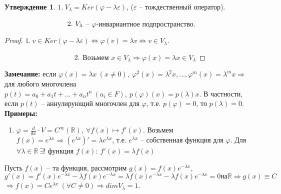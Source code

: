 \documentclass[a4paper, 12pt]{article}
\newcommand\tab[1][.5cm]{\hspace*{#1}}
\theoremstyle{definition}
\newtheorem*{subtheorem}{Утверждение}
\begin{document}
    \begin{subtheorem}
        $1.\ V_\lambda = Ker(\varphi - \lambda \varepsilon)$,
        ($\varepsilon$ -- тождественный оператор).
        
        $\tab[3.15cm] 2.\ V_\lambda$ -- $\varphi$-инвариантное
        подпространство. 
    \end{subtheorem}
    \begin{proof}
        $1.\ v \in Ker(\varphi - \lambda \varepsilon)
        \Longleftrightarrow \varphi(v) = \lambda v
        \Longleftrightarrow v \in V_\lambda$.

        $\tab[3.5cm]2.$ Возьмем $x \in V_\lambda \Longrightarrow 
        \varphi(x) = \lambda x \in V_\lambda$   
    \end{proof}
    \textbf{Замечание:} если $\varphi(x) = \lambda x\ (x \neq 0),\ 
    \varphi^2(x) = \lambda^2x,...,\varphi^m(x) = \lambda^mx
    \Longrightarrow$ для любого многочлена $p(t) = a_0 + 
    a_1t + ... + a_nt^n\ (a_i \in F),\ p(\varphi)(x) = 
    p(\lambda)x$. В частности, если $p(t)$ -- аннулирующий
    многочлен для $\varphi$, т.е. $p(\varphi) = 0$, то
    $p(\lambda) = 0$.
    \newpage
    \textbf{Примеры:}
    \begin{enumerate}
        \item $\varphi = \frac{d}{dx}\cdot V = C^\infty(\mathbb{R}),
        \ \forall f(x) \longmapsto f'(x)$. Возьмем $f(x) =
        e^{\lambda x} \Longrightarrow (e^{\lambda x})' = 
        \lambda e^{\lambda x}$, т.е. $e^{\lambda x}$ --
        собственная функция для $\varphi$. Для $\forall 
        \lambda \in \mathbb{R}\ \exists !$ функция $f(x):\ 
        f'(x) = \lambda f(x)$   
    \end{enumerate}  

    Пусть $f(x)$ -- та функция, рассмотрим $g(x) = f(x)e^{
    -\lambda x},$ $$g'(x) = f'(x)e^{-\lambda x} - \lambda f(x)
    e^{-\lambda x}  = \lambda f(x)e^{-\lambda x} -
    \lambda f(x)e^{-\lambda x} = 0 \text{на} \mathbb{R} \Longrightarrow 
    g(x) \equiv C$$ $\Longrightarrow f(x) = Ce^{\lambda x}\ 
    (\forall C \neq 0) \Longrightarrow dimV_\lambda = 1$.
    
\end{document}
